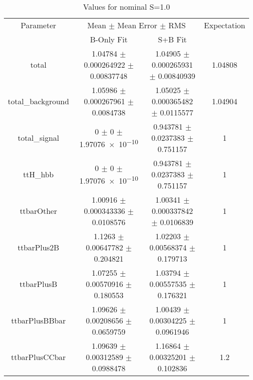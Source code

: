 \begin{table}
\centering
\caption{Values for nominal S=1.0}
\begin{tabular}{cccc}
\toprule
Parameter & \multicolumn{2}{c}{Mean $\pm$ Mean Error $\pm$ RMS} & Expectation\\
 & B-Only Fit & S+B Fit & \\
\midrule
total & \num{1.04784} $\pm$ \num{0.000264922} $\pm$ \num{0.00837748} & \num{1.04905} $\pm$ \num{0.000265931} $\pm$ \num{0.00840939} & \num{1.04808}\\
total\_background & \num{1.05986} $\pm$ \num{0.000267961} $\pm$ \num{0.0084738} & \num{1.05025} $\pm$ \num{0.000365482} $\pm$ \num{0.0115577} & \num{1.04904}\\
total\_signal & \num{0} $\pm$ \num{0} $\pm$ \num{1.97076e-10} & \num{0.943781} $\pm$ \num{0.0237383} $\pm$ \num{0.751157} & \num{1}\\
ttH\_hbb & \num{0} $\pm$ \num{0} $\pm$ \num{1.97076e-10} & \num{0.943781} $\pm$ \num{0.0237383} $\pm$ \num{0.751157} & \num{1}\\
ttbarOther & \num{1.00916} $\pm$ \num{0.000343336} $\pm$ \num{0.0108576} & \num{1.00341} $\pm$ \num{0.000337842} $\pm$ \num{0.0106839} & \num{1}\\
ttbarPlus2B & \num{1.1263} $\pm$ \num{0.00647782} $\pm$ \num{0.204821} & \num{1.02203} $\pm$ \num{0.00568374} $\pm$ \num{0.179713} & \num{1}\\
ttbarPlusB & \num{1.07255} $\pm$ \num{0.00570916} $\pm$ \num{0.180553} & \num{1.03794} $\pm$ \num{0.00557535} $\pm$ \num{0.176321} & \num{1}\\
ttbarPlusBBbar & \num{1.09626} $\pm$ \num{0.00208656} $\pm$ \num{0.0659759} & \num{1.00439} $\pm$ \num{0.00304225} $\pm$ \num{0.0961946} & \num{1}\\
ttbarPlusCCbar & \num{1.09639} $\pm$ \num{0.00312589} $\pm$ \num{0.0988478} & \num{1.16864} $\pm$ \num{0.00325201} $\pm$ \num{0.102836} & \num{1.2}\\
\bottomrule
\end{tabular}
\end{table}